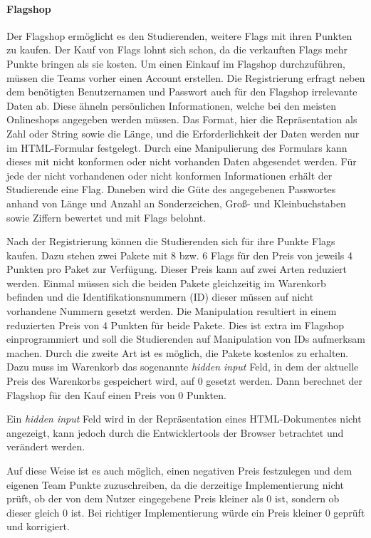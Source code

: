 \paragraph{Flagshop} \label{para:Flagshop}
Der Flagshop ermöglicht es den Studierenden, weitere Flags mit ihren Punkten zu kaufen. Der Kauf von Flags lohnt sich schon, da die verkauften Flags mehr Punkte bringen als sie kosten. Um einen Einkauf im Flagshop durchzuführen, müssen die Teams vorher einen Account erstellen. Die Registrierung erfragt neben dem benötigten Benutzernamen und Passwort auch für den Flagshop irrelevante Daten ab. Diese ähneln persönlichen Informationen, welche bei den meisten Onlineshops angegeben werden müssen. Das Format, hier die Repräsentation als Zahl oder String sowie die Länge, und die Erforderlichkeit der Daten werden nur im HTML-Formular festgelegt. Durch eine Manipulierung des Formulars kann dieses mit nicht konformen oder nicht vorhanden Daten abgesendet werden. Für jede der nicht vorhandenen oder nicht konformen Informationen erhält der Studierende eine Flag. Daneben wird die Güte des angegebenen Passwortes anhand von Länge und Anzahl an Sonderzeichen, Groß- und Kleinbuchstaben sowie Ziffern bewertet und mit Flags belohnt.

Nach der Registrierung können die Studierenden sich für ihre Punkte Flags kaufen. Dazu stehen zwei Pakete mit 8 bzw. 6 Flags für den Preis von jeweils 4 Punkten pro Paket zur Verfügung. Dieser Preis kann auf zwei Arten reduziert werden. 
Einmal müssen sich die beiden Pakete gleichzeitig im Warenkorb befinden und die Identifikationsnummern (ID) dieser müssen auf nicht vorhandene Nummern gesetzt werden. Die Manipulation resultiert in einem reduzierten Preis von 4 Punkten für beide Pakete. Dies ist extra im Flagshop einprogrammiert und soll die Studierenden auf Manipulation von IDs aufmerksam machen.
Durch die zweite Art ist es möglich, die Pakete kostenlos zu erhalten. Dazu muss im Warenkorb das sogenannte \textit{hidden input} Feld, in dem der aktuelle Preis des Warenkorbs gespeichert wird, auf 0 gesetzt werden. Dann berechnet der Flagshop für den Kauf einen Preis von 0 Punkten.\cite[S. 63]{abtsUeberarbeitungUndErweiterung2016}

Ein \textit{hidden input} Feld wird in der Repräsentation eines HTML-Dokumentes nicht angezeigt, kann jedoch durch die Entwicklertools der Browser betrachtet und verändert werden. \cite{w3schoolsHTMLHiddenInput}

Auf diese Weise ist es auch möglich, einen negativen Preis festzulegen und dem eigenen Team Punkte zuzuschreiben, da die derzeitige Implementierung nicht prüft, ob der von dem Nutzer eingegebene Preis kleiner als 0 ist, sondern ob dieser gleich 0 ist. Bei richtiger Implementierung würde ein Preis kleiner 0 geprüft und korrigiert.

